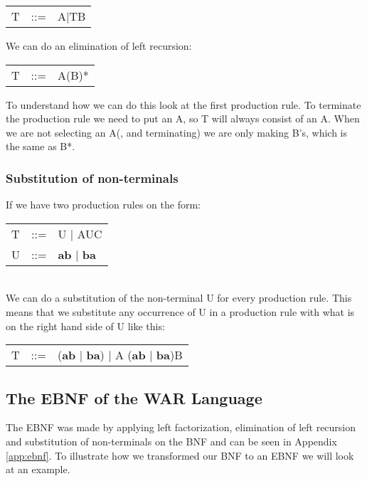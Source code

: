 			\begin{tabular}{l l l}
			\centering
				T		&	::=		&	A$\mid$TB \\
			\end{tabular}
			
			We can do an elimination of left recursion: \\
			
			\begin{tabular}{l l l}
			\centering
				T		&	::=		&	A(B)* \\
			\end{tabular}
			
			To understand how we can do this look at the first production rule. To terminate the production rule we need 
			to put an A, so T will always consist of an A. When we are not selecting an A(, and terminating) we are only making B's, which is
			the same as B*.
		\subsubsection*{Substitution of non-terminals}
			If we have two production rules on the form: \\
			
			\begin{tabular}{l l l}
			\centering
				T		&	::=		&	U $\mid$ AUC \\
				U		&	::=		&	{\bf ab} $\mid$ {\bf ba} \\
			\end{tabular} \\
			
			We can do a substitution of the non-terminal U for every production rule. This means that we 
			substitute any occurrence of U in a production rule with what is on the right hand side of U like this: \\
			
			\begin{tabular}{l l l}
			\centering
				T		&	::=		&	({\bf ab} $\mid$ {\bf ba}) $\mid$ A ({\bf ab} $\mid$ {\bf ba})B \\
			\end{tabular}
	\subsection{The EBNF of the WAR Language}
		The EBNF was made by applying left factorization, elimination of left recursion and substitution of non-terminals on the BNF 
		and can be seen in Appendix \ref{app:ebnf}.
		To illustrate how we transformed our BNF to an EBNF we will look at an example.
